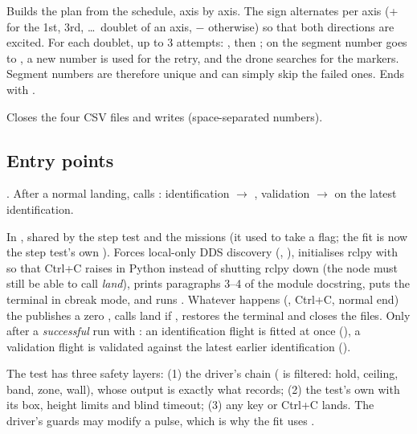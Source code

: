Builds the plan \code{[(axis, A, T)]} from the schedule, axis by axis. The sign alternates per axis
(+ for the 1st, 3rd, \dots\ doublet of an axis, $-$ otherwise) so that both directions are excited. For each
doublet, up to 3 attempts: , then ; on  the segment number goes to
, a new number is used for the retry, and the drone searches for the markers. Segment
numbers are therefore unique and  can simply skip the failed ones. Ends with
.

Closes the four CSV files and writes  (space-separated numbers).

\subsection{Entry points}

. After a normal landing,  calls : identification
$\to$ , validation $\to$  on the latest identification.

In , shared by the step test and the missions (it used to take a  flag;
the fit is now the step test's own ). Forces local-only DDS discovery
(, ), initialises rclpy with
 so that Ctrl+C raises  in Python instead of shutting
rclpy down (the node must still be able to call \emph{land}), prints paragraphs 3--4 of the module docstring,
puts the terminal in cbreak mode, and runs . Whatever happens (, Ctrl+C, normal end)
the  publishes a zero , calls land if , restores the terminal and closes
the files. Only after a \emph{successful} run with : an identification flight is fitted at once
(), a validation flight is validated against the latest earlier identification
().

\begin{keypoint}
The test has three safety layers: (1) the driver's chain ( is filtered: hold, ceiling,
band, zone, wall), whose output is exactly what  records; (2) the test's own  with
its box, height limits and blind timeout; (3) any key or Ctrl+C lands. The driver's guards may modify a pulse,
which is why the fit uses .
\end{keypoint}

